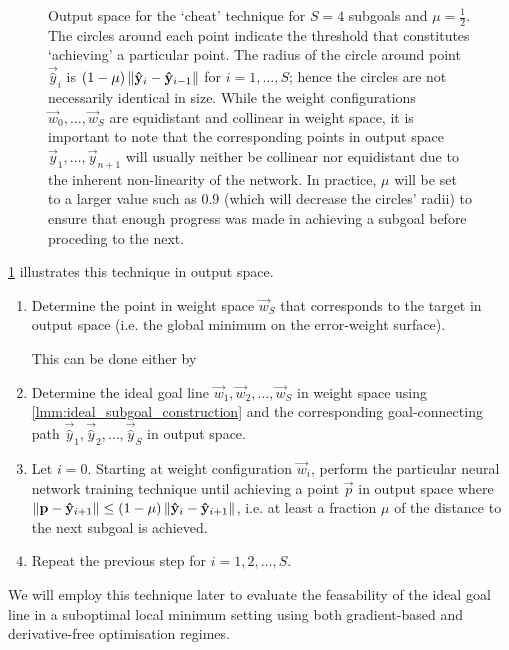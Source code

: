 \begin{figure}
    \caption{Output space for the `cheat' technique for $S=4$ subgoals and $\mu=\frac{1}{2}$. The circles around each point indicate the threshold that constitutes `achieving' a particular point. The radius of the circle around point $\vec{\hat{y}}_i$ is $(1-\mu) \left\lVert\mathbf{\hat{y}}_i-\mathbf{\hat{y}}_{i-1}\right\rVert$ for $i=1, \dots, S$; hence the circles are not necessarily identical in size. While the weight configurations $\vec{w}_0, \dots, \vec{w}_S$ are equidistant and collinear in weight space, it is important to note that the corresponding points in output space $\vec{y}_1, \dots, \vec{y}_{n+1}$ will usually neither be collinear nor equidistant due to the inherent non-linearity of the network. In practice, $\mu$ will be set to a larger value such as $0.9$ (which will decrease the circles' radii) to ensure that enough progress was made in achieving a subgoal before proceding to the next.}
    \label{fig:cheat_technique}
\end{figure}
\ref{fig:cheat_technique} illustrates this technique in output space.
\begin{enumerate}
    \item Determine the point in weight space $\vec{w}_S$ that corresponds to the target in output space (i.e. the global minimum on the error-weight surface). 
        
        This can be done either by
    
    \item Determine the ideal goal line $\vec{w}_1,\vec{w}_2,\dots,\vec{w}_S$ in weight space using \ref{lmm:ideal_subgoal_construction} and the corresponding goal-connecting path $\vec{\hat{y}}_1,\vec{\hat{y}}_2,\dots,\vec{\hat{y}}_S$ in output space.
    \item Let $i=0$. Starting at weight configuration $\vec{w}_i$, perform the particular neural network training technique until achieving a point $\vec{p}$ in output space where $\left\lVert\mathbf{p} - \mathbf{\hat{y}}_{i+1}\right\rVert \leq (1-\mu) \left\lVert\mathbf{\hat{y}}_i - \mathbf{\hat{y}}_{i+1}\right\rVert$, i.e. at least a fraction $\mu$ of the distance to the next subgoal is achieved.
    \item Repeat the previous step for $i=1, 2, \dots, S$.
\end{enumerate}
We will employ this technique later to evaluate the feasability of the ideal goal line in a suboptimal local minimum setting using both gradient-based and derivative-free optimisation regimes.

